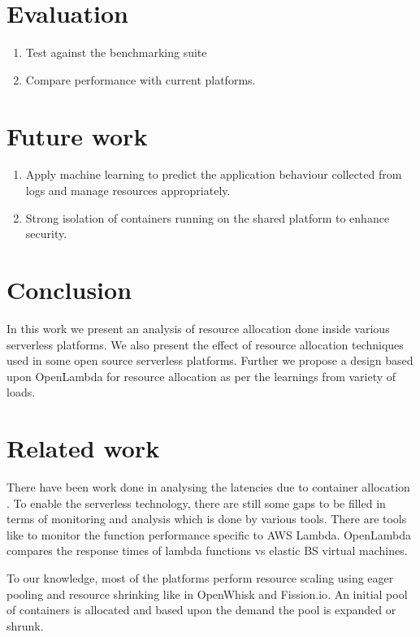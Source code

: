 \documentclass[letterpaper,twocolumn,10pt]{article}
\begin{document}
\section{Evaluation}
\label{sec:fourth}
\begin{enumerate}
\item Test against the benchmarking suite
\item Compare performance with current platforms.
\end{enumerate}


\section{Future work}
\label{sec:fifth}
\begin{enumerate}
\item Apply machine learning to predict the application behaviour collected from logs and manage resources appropriately.
\item Strong isolation of containers running on the shared platform to enhance security.
\end{enumerate}

\section{Conclusion}
\label{sec:sixth}
In this work we present an analysis of resource allocation done inside various serverless platforms. We also present the effect of resource allocation techniques used in some open source serverless platforms. Further we propose a design based upon OpenLambda for resource allocation as per the learnings from variety of loads.

\section{Related work}
\label{sec:seventh}
There have been work done in analysing the latencies due to container allocation \cite{mcgrath.wp}. To enable the serverless technology, there are still some gaps to be filled in terms of monitoring and analysis which is done by various tools. There are tools like \cite{iopipe} to monitor the function performance specific to AWS Lambda. OpenLambda \cite{openlambda.wp} compares the response times of lambda functions vs elastic BS virtual machines.

To our knowledge, most of the platforms perform resource scaling using eager pooling and resource shrinking like in OpenWhisk\cite{whisk} and Fission.io\cite{fission}. An initial pool of containers is allocated and based upon the demand the pool is expanded or shrunk.


{
  \small 
  
  
}
\end{document}
